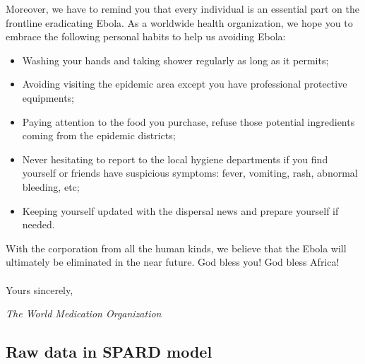 {  Moreover, we have to remind you that every individual is an essential part on the frontline eradicating Ebola. As a worldwide health organization, we hope you to embrace the following personal habits to help us avoiding Ebola:

  \begin{itemize}
    \item Washing your hands and taking shower regularly as long as it permits;
    
    \item Avoiding visiting the epidemic area except you have professional protective equipments;
    
    \item Paying attention to the food you purchase, refuse those potential ingredients coming from the epidemic districts;
    
    \item Never hesitating to report to the local hygiene departments if you find yourself or friends have suspicious symptoms: fever, vomiting, rash, abnormal bleeding, etc;
    
    \item Keeping yourself updated with the dispersal news and prepare yourself if needed.
    
  \end{itemize}

With the corporation from all the human kinds, we believe that the Ebola will ultimately be eliminated in the near future. God bless you! God bless Africa!
\\
\\
Yours sincerely,

\textit{The World Medication Organization }
\newpage



\newpage
\begin{appendices}
\section{Raw data in \textbf{SPARD} model}

\end{appendices}}
